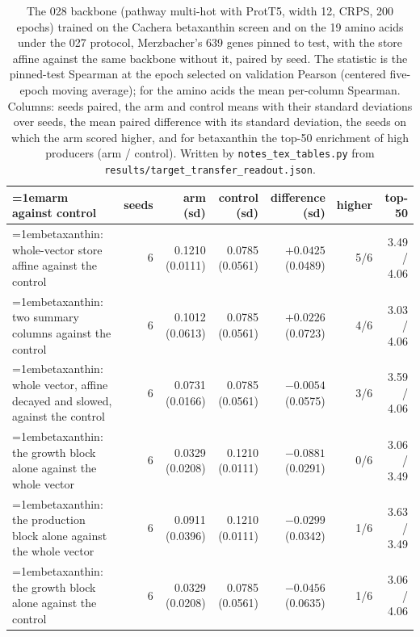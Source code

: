 \begin{table}[H]
  \centering
  \footnotesize
  \setlength{\tabcolsep}{2.5pt}
  \caption[Rounds 117 to 119: the module on betaxanthin and the amino acids]{The 028 backbone (pathway multi-hot with ProtT5, width 12, CRPS, 200 epochs) trained on the Cachera betaxanthin screen and on the 19 amino acids under the 027 protocol, Merzbacher's 639 genes pinned to test, with the store affine against the same backbone without it, paired by seed. The statistic is the pinned-test Spearman at the epoch selected on validation Pearson (centered five-epoch moving average); for the amino acids the mean per-column Spearman. Columns: seeds paired, the arm and control means with their standard deviations over seeds, the mean paired difference with its standard deviation, the seeds on which the arm scored higher, and for betaxanthin the top-50 enrichment of high producers (arm / control). Written by \texttt{notes\_tex\_tables.py} from \texttt{results/target\_transfer\_readout.json}.}
  \label{tab:target-transfer}
  \begin{tabular}{@{}>{\raggedright\hangindent=1em\hangafter=1\arraybackslash}p{78.5mm}rrrrrr@{}}
    \hline
    arm against control & seeds & arm (sd) & control (sd) & difference (sd) & higher & top-50 \\
    \hline
    betaxanthin: whole-vector store affine against the control & 6 & 0.1210 (0.0111) & 0.0785 (0.0561) & $+0.0425$ (0.0489) & 5/6 & 3.49 / 4.06 \\
    betaxanthin: two summary columns against the control & 6 & 0.1012 (0.0613) & 0.0785 (0.0561) & $+0.0226$ (0.0723) & 4/6 & 3.03 / 4.06 \\
    betaxanthin: whole vector, affine decayed and slowed, against the control & 6 & 0.0731 (0.0166) & 0.0785 (0.0561) & $-0.0054$ (0.0575) & 3/6 & 3.59 / 4.06 \\
    betaxanthin: the growth block alone against the whole vector & 6 & 0.0329 (0.0208) & 0.1210 (0.0111) & $-0.0881$ (0.0291) & 0/6 & 3.06 / 3.49 \\
    betaxanthin: the production block alone against the whole vector & 6 & 0.0911 (0.0396) & 0.1210 (0.0111) & $-0.0299$ (0.0342) & 1/6 & 3.63 / 3.49 \\
    betaxanthin: the growth block alone against the control & 6 & 0.0329 (0.0208) & 0.0785 (0.0561) & $-0.0456$ (0.0635) & 1/6 & 3.06 / 4.06 \\

\end{tabular}
\end{table}
